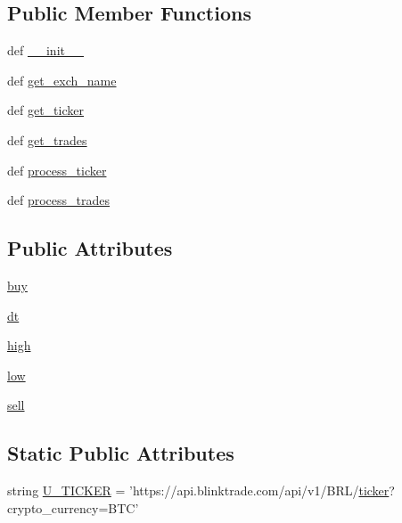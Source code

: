 \subsection*{Public Member Functions}
\begin{DoxyCompactItemize}
\item 
def \hyperlink{classexchange_1_1_fox_bit_aeeafe8e1c8237d514ce89c97727ed61d}{\-\_\-\-\_\-init\-\_\-\-\_\-}
\item 
def \hyperlink{classexchange_1_1_fox_bit_a9a72f6a5be4e42688d38f83bcd80aab3}{get\-\_\-exch\-\_\-name}
\item 
def \hyperlink{classexchange_1_1_fox_bit_a4a2bd57624f0aed8e1bf22ce6399bd3e}{get\-\_\-ticker}
\item 
def \hyperlink{classexchange_1_1_fox_bit_ae9e9965d6e92ab9413e17637ea22feb7}{get\-\_\-trades}
\item 
def \hyperlink{classexchange_1_1_fox_bit_a048fcf7385a868f1834ad3898bdfec2d}{process\-\_\-ticker}
\item 
def \hyperlink{classexchange_1_1_fox_bit_a02f1d212907016aa1da6bac19821ea43}{process\-\_\-trades}
\end{DoxyCompactItemize}
\subsection*{Public Attributes}
\begin{DoxyCompactItemize}
\item 
\hyperlink{classexchange_1_1_fox_bit_acb7e709cc05e8314b1bdacd32e4dfc80}{buy}
\item 
\hyperlink{classexchange_1_1_fox_bit_a363f8488eb0423f88519c085ae6f168f}{dt}
\item 
\hyperlink{classexchange_1_1_fox_bit_a4f6dfaecbcc17ceadddf52d266d9c00d}{high}
\item 
\hyperlink{classexchange_1_1_fox_bit_acd666444cff98fe477651120ddb0f915}{low}
\item 
\hyperlink{classexchange_1_1_fox_bit_ac1fae4ef7a43254b71d7173a5cc6eeaf}{sell}
\end{DoxyCompactItemize}
\subsection*{Static Public Attributes}
\begin{DoxyCompactItemize}
\item 
string \hyperlink{classexchange_1_1_fox_bit_a7ba3f64a2b55479da2239393c6140ec8}{U\-\_\-\-T\-I\-C\-K\-E\-R} = 'https\-://api.\-blinktrade.\-com/api/v1/B\-R\-L/\hyperlink{classexchange_1_1_exchange_a7cf9e52f993627955a2e242c388daaeb}{ticker}?crypto\-\_\-currency=B\-T\-C'
\end{DoxyCompactItemize}


